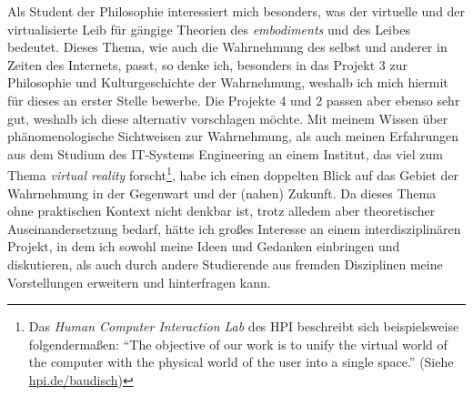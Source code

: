 \documentclass[a4paper]{article}
\begin{document}
Als Student der Philosophie interessiert mich besonders, was der virtuelle und der virtualisierte Leib für gängige Theorien des \emph{embodiments} und des Leibes bedeutet. Dieses Thema, wie auch die Wahrnehmung des selbst und anderer in Zeiten des Internets, passt, so denke ich, besonders in das Projekt 3 zur Philosophie und Kulturgeschichte der Wahrnehmung, weshalb ich mich hiermit für dieses an erster Stelle bewerbe. Die Projekte 4 und 2 passen aber ebenso sehr gut, weshalb ich diese alternativ vorschlagen möchte. Mit meinem Wissen über phänomenologische Sichtweisen zur Wahrnehmung, als auch meinen Erfahrungen aus dem Studium des IT-Systems Engineering an einem Institut, das viel zum Thema \emph{virtual reality} forscht\footnote{Das \emph{Human Computer Interaction Lab} des HPI beschreibt sich beispielsweise folgendermaßen: "`The objective of our work is to unify the virtual world of the computer with the physical world of the user into a single space."' (Siehe \url{hpi.de/baudisch})}, habe ich einen doppelten Blick auf das Gebiet der Wahrnehmung in der Gegenwart und der (nahen) Zukunft. Da dieses Thema ohne praktischen Kontext nicht denkbar ist, trotz alledem aber theoretischer Auseinandersetzung bedarf, hätte ich großes Interesse an einem interdisziplinären Projekt, in dem ich sowohl meine Ideen und Gedanken einbringen und diskutieren, als auch durch andere Studierende aus fremden Disziplinen meine Vorstellungen erweitern und hinterfragen kann.

\newpage
\nocite{*}
\printbibliography
\end{document}
